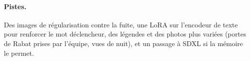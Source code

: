 \documentclass[11pt,a4paper]{article}
\begin{document}
\begin{center}
\end{center}

\paragraph{Pistes.} Des images de régularisation contre la fuite, une LoRA sur l'encodeur de texte pour renforcer le mot déclencheur, des légendes et des photos plus variées (portes de Rabat prises par l'équipe, vues de nuit), et un passage à SDXL si la mémoire le permet.
\end{document}
